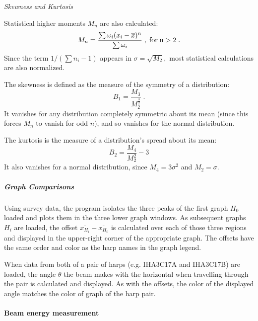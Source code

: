 	{\sl Skewness and Kurtosis}

Statistical higher moments $M_n$ are also calculated:
\begin{equation}
M_n = \frac{\sum \omega_i (x_i-\overline{x})^n}{\sum \omega_i} \; , \; {\rm for \; n>2} \; .
\end{equation}
Since the term $1/(\sum n_i-1)$ appears in $\sigma=\sqrt{M_2},$ most statistical calculations
are also normalized.  

The skewness is defined as the measure of the symmetry of a distribution:
\begin{equation}
B_1=\frac{M_3}{M_2^\frac{3}{2}} \; .
\end{equation}
It vanishes for any distribution completely symmetric about its mean (since this forces $M_n$ to 
vanish for odd $n$), and so vanishes for the normal distribution.

The kurtosis is the measure of a distribution's spread about its mean:
\begin{equation}
B_2=\frac{M_4}{M_2^2}-3
\end{equation}
It also vanishes for a normal distribution, since $M_4=3\sigma^2$ and $M_2=\sigma.$

	\subparagraph{Graph Comparisons}

Using survey data, the program isolates the three peaks of the first graph $H_0$ loaded and plots them in the
three lower graph windows.  As subsequent graphs $H_i$ are loaded, the offset
$\overline{x_{H_i}}-\overline{x_{H_0}}$ is calculated over each of those three regions and displayed in the 
upper-right corner of the appropriate graph.  The offsets have the same order and color as the harp names in
the graph legend.
 
When data from both of a pair of harps (e.g. IHA3C17A and IHA3C17B) are loaded, the angle $\theta$ the
beam makes with the horizontal when travelling through the pair is calculated and displayed.  As with the
offsets, the color of the displayed angle matches the color of graph of the harp pair.

\paragraph{Beam energy measurement}\label{energy}

